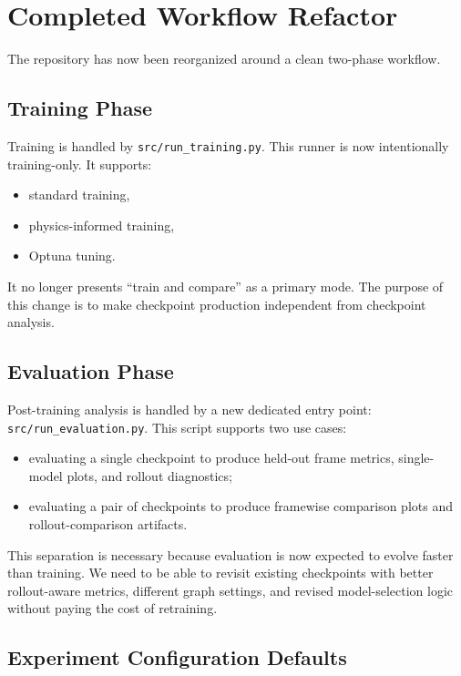 \documentclass[11pt]{article}
\begin{document}
\section{Completed Workflow Refactor}

The repository has now been reorganized around a clean two-phase workflow.

\subsection{Training Phase}

Training is handled by \texttt{src/run\_training.py}. This runner is now intentionally training-only. It supports:

\begin{itemize}
  \item standard training,
  \item physics-informed training,
  \item Optuna tuning.
\end{itemize}

It no longer presents ``train and compare'' as a primary mode. The purpose of this change is to make checkpoint production independent from checkpoint analysis.

\subsection{Evaluation Phase}

Post-training analysis is handled by a new dedicated entry point: \texttt{src/run\_evaluation.py}. This script supports two use cases:

\begin{itemize}
  \item evaluating a single checkpoint to produce held-out frame metrics, single-model plots, and rollout diagnostics;
  \item evaluating a pair of checkpoints to produce framewise comparison plots and rollout-comparison artifacts.
\end{itemize}

This separation is necessary because evaluation is now expected to evolve faster than training. We need to be able to revisit existing checkpoints with better rollout-aware metrics, different graph settings, and revised model-selection logic without paying the cost of retraining.

\subsection{Experiment Configuration Defaults}
\end{document}
